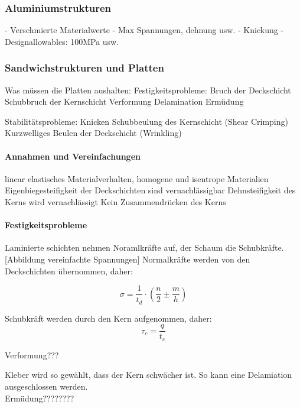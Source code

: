   \subsubsection{Aluminiumstrukturen}
    - Verschmierte Materialwerte
    - Max Spannungen, dehnung usw.
    - Knickung
    - Designallowables: 100MPa usw.

  \subsubsection{Sandwichstrukturen und Platten}
  Was müssen die Platten aushalten:
  Festigkeitsprobleme:
    Bruch der Deckschicht
    Schubbruch der Kernschicht
    Verformung
    Delamination
    Ermüdung


  Stabilitätsprobleme:
    Knicken
    Schubbeulung des Kernschicht (Shear Crimping)
    Kurzwelliges Beulen der Deckschicht (Wrinkling)

  \paragraph{Annahmen und Vereinfachungen}
  linear elastisches Materialverhalten,
  homogene und isentrope Materialien
  Eigenbiegesteifigkeit der Deckschichten sind vernachlässigbar
  Dehnsteifigkeit des Kerns wird vernachlässigt
  Kein Zusammendrücken des Kerns

  \paragraph{Festigkeitsprobleme}
  Laminierte schichten nehmen Noramlkräfte auf, der Schaum die Schubkräfte.
  [Abbildung vereinfachte Spannungen]
  Normalkräfte werden von den Deckschichten übernommen, daher:

  \begin{equation}
    \label{Spannung in Deckschicht}
    \sigma = \frac{1}{t_d}\cdot \left ( \frac{n}{2} \pm \frac{m}{h}\right )
  \end{equation}

  Schubkräft werden durch den Kern aufgenommen, daher:
  \begin{equation}
    \label{Schubspannungen im Kern}
    \tau_c = \frac{q}{t_c}
  \end{equation}

  Verformung???


  Kleber wird so gewählt, dass der Kern schwächer ist. So kann eine Delamiation ausgeschlossen werden.\\
  Ermüdung????????

